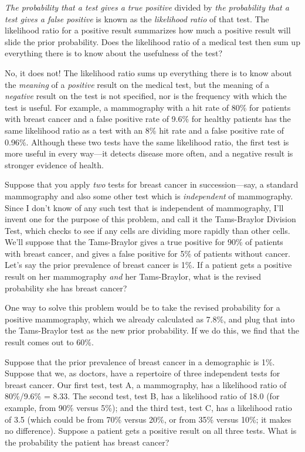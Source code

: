 {
 \textit{The probability that a test gives a true positive} divided
by \textit{the probability that a }\textit{test gives a false positive}
is known as the \textit{likelihood ratio} of that test. The likelihood
ratio for a positive result summarizes how much a positive result will
slide the prior probability. Does the likelihood ratio of a medical
test then sum up everything there is to know about the usefulness of
the test?}

{
 No, it does not! The likelihood ratio sums up everything there is
to know about the \textit{meaning} of a \textit{positive} result on the
medical test, but the meaning of a \textit{negative} result on the test
is not specified, nor is the frequency with which the test is useful.
For example, a mammography with a hit rate of 80\% for patients with
breast cancer and a false positive rate of 9.6\% for healthy patients
has the same likelihood ratio as a test with an 8\% hit rate and a
false positive rate of 0.96\%. Although these two tests have the same
likelihood ratio, the first test is more useful in every way---it
detects disease more often, and a negative result is stronger evidence
of health.}

{
 Suppose that you apply \textit{two} tests for breast cancer in
succession---say, a standard mammography and also some other test which
is \textit{independent} of mammography. Since I don't
know of any such test that is independent of mammography,
I'll invent one for the purpose of this problem, and
call it the Tams-Braylor Division Test, which checks to see if any
cells are dividing more rapidly than other cells. We'll
suppose that the Tams-Braylor gives a true positive for 90\% of
patients with breast cancer, and gives a false positive for 5\% of
patients without cancer. Let's say the prior prevalence
of breast cancer is 1\%. If a patient gets a positive result on her
mammography \textit{and} her Tams-Braylor, what is the revised
probability she has breast cancer?}

{
 One way to solve this problem would be to take the revised
probability for a positive mammography, which we already calculated as
7.8\%, and plug that into the Tams-Braylor test as the new prior
probability. If we do this, we find that the result comes out to 60\%.}

{
 Suppose that the prior prevalence of breast cancer in a
demographic is 1\%. Suppose that we, as doctors, have a repertoire of
three independent tests for breast cancer. Our first test, test A, a
mammography, has a likelihood ratio of 80\%/9.6\% = 8.33. The second
test, test B, has a likelihood ratio of 18.0 (for example, from 90\%
versus 5\%); and the third test, test C, has a likelihood ratio of 3.5
(which could be from 70\% versus 20\%, or from 35\% versus 10\%; it
makes no difference). Suppose a patient gets a positive result on all
three tests. What is the probability the patient has breast cancer?}

